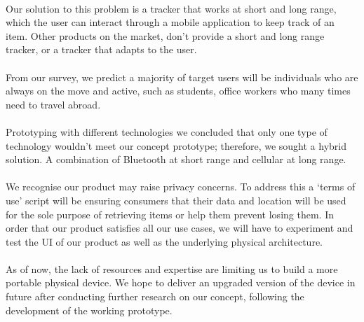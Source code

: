 \documentclass[12pt,a4paper]{article}
\begin{document}
      \paragraph{}
      Our solution to this problem is a tracker that works at short and long range, which the user can interact through a mobile application to keep track of an item. Other products on the market, don't provide a short and long range tracker, or a tracker that adapts to the user. 
      \paragraph{}
      From our survey, we predict a majority of target users will be individuals who are always on the move and active, such as students, office workers who many times need to travel abroad. 
      \paragraph{}
      Prototyping with different technologies we concluded that only one type of technology wouldn’t meet our concept prototype; therefore, we sought a hybrid solution. A combination of Bluetooth at short range and cellular at long range.
      \paragraph{}
      We recognise our product may raise privacy concerns. To address this a ‘terms of use’ script will be ensuring consumers that their data and location will be used for the sole purpose of retrieving items or help them prevent losing them. In order that our product satisfies all our use cases, we will have to experiment and test the UI of our product as well as the underlying physical architecture.
      \paragraph{}
      As of now, the lack of resources and expertise are limiting us to build a more portable physical device. We hope to deliver an upgraded version of the device in future after conducting further research on our concept, following the development of the working prototype.
\end{document}
